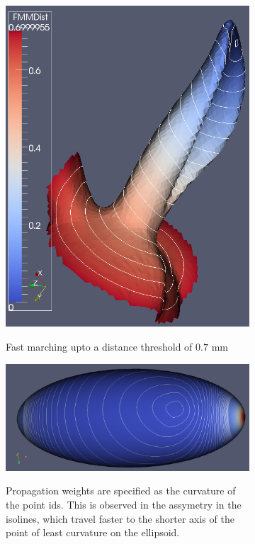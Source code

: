 \documentclass{InsightArticle}
\begin{document}
\begin{figure}
  \centering
  \begin{subfigure}[b]{0.3\textwidth}
    \centering
    \includegraphics[width=\textwidth]{BunnyGeodesicDistanceStoppingCriteria}
    \label{fig:BunnyGeodesicDistanceStoppingCriteria}
    \caption{Fast marching upto a distance threshold of $0.7$ mm}
  \end{subfigure}
  \qquad
  \begin{subfigure}[b]{0.5\textwidth}
    \centering
    \includegraphics[width=\textwidth]{EllipsoidFastMarchingWithCurvatureGuidedPropagation}
    \label{fig:EllipsoidPropagationWt}
    \caption{Propagation weights are specified as the curvature of the point ids. This is observed in the assymetry in the isolines, which travel faster to the shorter axis of the point of least curvature on the ellipsoid.}
  \end{subfigure}
\caption{ }
\label{fig:GeodesicConstraints}
\end{figure}
\end{document}
